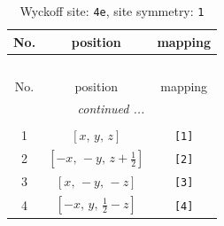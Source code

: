 \documentclass[fleqn,8pt]{jsarticle}
\begin{document}
\begin{longtable}{ccc}
\caption{Wyckoff site: {\tt 4e}, site symmetry: {\tt 1}}
 \\
 \hline \hline
No. & position & mapping \\ \hline \endfirsthead

\multicolumn{2}{l}{\tablename\ \thetable{}} \\
 \hline \hline
No. & position & mapping \\ \hline \endhead

 \hline \hline
\multicolumn{2}{r}{\footnotesize\it continued ...} \\ \endfoot

 \hline \hline
\multicolumn{2}{r}{} \\ \endlastfoot

1 & $\left[ x,\, y,\, z \right]$ & {\tt [1]} \\ \hline
2 & $\left[ - x,\, - y,\, z + \frac{1}{2} \right]$ & {\tt [2]} \\ \hline
3 & $\left[ x,\, - y,\, - z \right]$ & {\tt [3]} \\ \hline
4 & $\left[ - x,\, y,\, \frac{1}{2} - z \right]$ & {\tt [4]} \\
\end{longtable}
\end{document}
